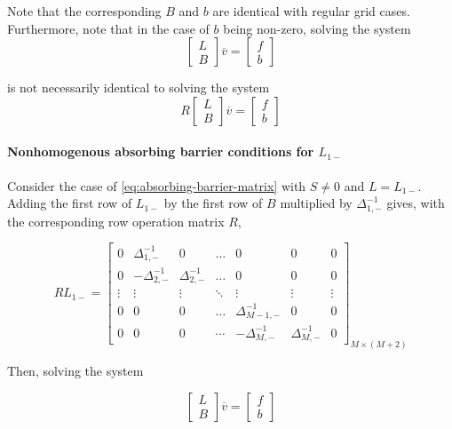 \documentclass[11pt]{article}
\theoremstyle{definition}
\begin{document}
Note that the corresponding $B$ and $b$ are identical with regular grid cases. Furthermore, note that in the case of $b$ being non-zero, solving the system 
\begin{equation}
\begin{bmatrix}
 L \\
 B
\end{bmatrix} 
\overline{v}
=
\begin{bmatrix}
f \\
b
\end{bmatrix}
\end{equation}

is not necessarily identical to solving the system
\begin{equation}
R \begin{bmatrix}
 L \\
 B
\end{bmatrix} 
\overline{v}
=
\begin{bmatrix}
f \\
b
\end{bmatrix}
\end{equation}


\paragraph{Nonhomogenous absorbing barrier conditions for $L_{1-}$}

Consider the case of \cref{eq:absorbing-barrier-matrix} with $S\neq 0$ and $L = L_{1-}$. Adding the first row of $L_{1-}$ by the first row of $B$ multiplied by $\Delta_{1,-}^{-1}$ gives, with the corresponding row operation matrix $R$, 

\begin{equation}
R {L}_{1-} = \begin{bmatrix}
0&\Delta_{1,-}^{-1} &0&\dots&0&0&0\\
0&-\Delta_{2,-}^{-1}&\Delta_{2,-}^{-1}&\dots&0&0&0\\
\vdots&\vdots&\vdots&\ddots&\vdots&\vdots&\vdots\\
0&0&0&\dots&\Delta_{M-1,-}^{-1}&0&0\\
0&0&0&\cdots&-\Delta_{M,-}^{-1}&\Delta_{M,-}^{-1}&0
\end{bmatrix}_{M\times (M+2)}
\end{equation}

Then, solving the system 

\begin{equation}
\begin{bmatrix}
 L \\
 B
\end{bmatrix} 
\overline{v} 
=
\begin{bmatrix}
f \\
b
\end{bmatrix}
\end{equation}
\end{document}
